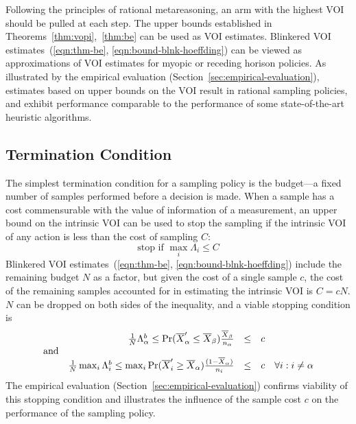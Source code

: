 \documentclass{article}
\begin{document}
Following the principles of rational metareasoning, an arm with
the highest VOI should be pulled at each step. The upper bounds
established in Theorems~\ref{thm:vopi},~\ref{thm:be} can be used
as VOI estimates. Blinkered VOI estimates~(\ref{eqn:thm-be},
 \ref{eqn:bound-blnk-hoeffding}) can be viewed
as approximations of VOI estimates for myopic or
receding horison policies. As illustrated by the empirical evaluation
(Section~\ref{sec:empirical-evaluation}), estimates based on upper
bounds on the VOI result in rational sampling policies, and exhibit
performance comparable to the performance of some state-of-the-art
heuristic algorithms.

\subsection{Termination Condition}

The simplest termination condition for a sampling policy is the
budget---a fixed number of samples performed before a decision is
made. When a sample has a cost commensurable with the value of
information of a measurement, an upper bound on the intrinsic VOI can
be used to stop the sampling if the intrinsic VOI of any action
is less than the cost of sampling $C$:
\begin{equation}
\mbox{stop if } \max_i \Lambda_i \le C
\end{equation}
Blinkered VOI estimates~(\ref{eqn:thm-be},
\ref{eqn:bound-blnk-hoeffding}) include the remaining budget $N$ as a
factor, but given the cost of a single sample $c$, the cost of the
remaining samples accounted for in estimating the intrinsic VOI is
$C=cN$. $N$ can be dropped on both sides of the inequality,
and a viable stopping condition is
\begin{equation}
\begin{array}{c r r l l}
&\frac 1 N \Lambda_\alpha^b
\le\Pr(\overline X_\alpha'\le\overline X_\beta)\frac {\overline  X_\beta} {n_\alpha}&\le& c
&\nonumber\\
\mbox{and}&&&&\nonumber\\
&\frac 1 N \max_i\Lambda_i^b
\le \max_i\Pr(\overline X_i'\ge\overline X_\alpha)\frac {(1-\overline  X_\alpha)} {n_i}&\le& c
 & \forall i: i\ne\alpha
\end{array}
\label{eqn:stopping-blnk}
\end{equation}
The empirical evaluation (Section~\ref{sec:empirical-evaluation})
confirms viability of this stopping condition and illustrates the
influence of the sample cost $c$ on the performance of
the sampling policy.
\end{document}
